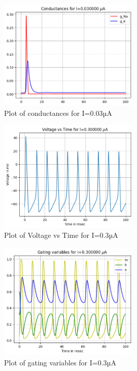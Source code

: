 \documentclass[12pt,a4paper]{report}
\begin{document}
\begin{figure}[H]
    \centering
    \includegraphics[width=0.6\textwidth]{./data/conductances_0_03uA.png}
    \caption{Plot of conductances for I=0.03µA}
    \label{fig:conductances_0_03uA}
\end{figure}



\begin{figure}[H]
    \centering
    \includegraphics[width=0.6\textwidth]{./data/voltage_time_0_3uA.png}
    \caption{Plot of Voltage vs Time for I=0.3µA}
    \label{fig:voltage_time_0_3uA}
\end{figure}

\begin{figure}[H]
    \centering
    \includegraphics[width=0.6\textwidth]{./data/gating_variables_0_3uA.png}
    \caption{Plot of gating variables for I=0.3µA}
    \label{fig:gating_variables_0_3uA}
\end{figure}
\end{document}
